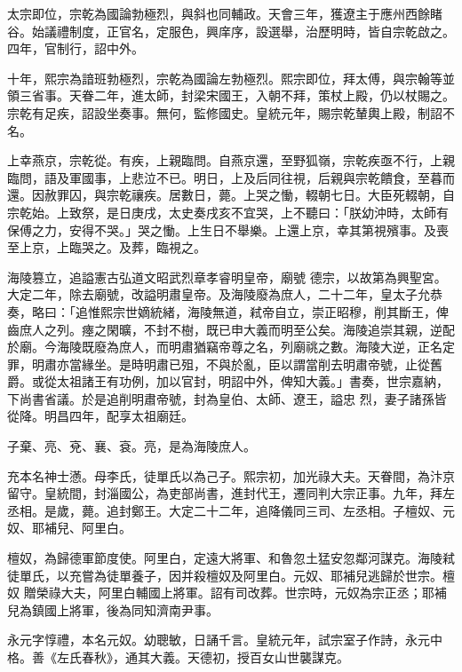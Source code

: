 \begin{pinyinscope}
 太宗即位，宗乾為國論勃極烈，與斜也同輔政。天會三年，獲遼主于應州西餘睹谷。始議禮制度，正官名，定服色，興庠序，設選舉，治歷明時，皆自宗乾啟之。四年，官制行，詔中外。



 十年，熙宗為諳班勃極烈，宗乾為國論左勃極烈。熙宗即位，拜太傅，與宗翰等並領三省事。天眷二年，進太師，封梁宋國王，入朝不拜，策杖上殿，仍以杖賜之。
 宗乾有足疾，詔設坐奏事。無何，監修國史。皇統元年，賜宗乾輦輿上殿，制詔不名。



 上幸燕京，宗乾從。有疾，上親臨問。自燕京還，至野狐嶺，宗乾疾亟不行，上親臨問，語及軍國事，上悲泣不已。明日，上及后同往視，后親與宗乾饋食，至暮而還。因赦罪囚，與宗乾禳疾。居數日，薨。上哭之慟，輟朝七日。大臣死輟朝，自宗乾始。上致祭，是日庚戌，太史奏戌亥不宜哭，上不聽曰：「朕幼沖時，太師有保傅之力，安得不哭。」哭之慟。上生日不舉樂。上還上京，幸其第視殯事。及喪至上京，上臨哭之。及葬，臨視之。



 海陵篡立，追謚憲古弘道文昭武烈章孝睿明皇帝，廟號
 德宗，以故第為興聖宮。大定二年，除去廟號，改謚明肅皇帝。及海陵廢為庶人，二十二年，皇太子允恭奏，略曰：「追惟熙宗世嫡統緒，海陵無道，弒帝自立，崇正昭穆，削其斷王，俾齒庶人之列。瘞之閑曠，不封不樹，既已申大義而明至公矣。海陵追崇其親，逆配於廟。今海陵既廢為庶人，而明肅猶竊帝尊之名，列廟祧之數。海陵大逆，正名定罪，明肅亦當緣坐。是時明肅已殂，不與於亂，臣以謂當削去明肅帝號，止從舊爵。或從太祖諸王有功例，加以官封，明詔中外，俾知大義。」書奏，世宗嘉納，下尚書省議。於是追削明肅帝號，封為皇伯、太師、遼王，謚忠
 烈，妻子諸孫皆從降。明昌四年，配享太祖廟廷。



 子棄、亮、兗、襄、袞。亮，是為海陵庶人。



 充本名神士懣。母李氏，徒單氏以為己子。熙宗初，加光祿大夫。天眷間，為汴京留守。皇統間，封淄國公，為吏部尚書，進封代王，遷同判大宗正事。九年，拜左丞相。是歲，薨。追封鄭王。大定二十二年，追降儀同三司、左丞相。子檀奴、元奴、耶補兒、阿里白。



 檀奴，為歸德軍節度使。阿里白，定遠大將軍、和魯忽土猛安忽鄰河謀克。海陵弒徒單氏，以充嘗為徒單養子，因并殺檀奴及阿里白。元奴、耶補兒逃歸於世宗。檀奴
 贈榮祿大夫，阿里白輔國上將軍。詔有司改葬。世宗時，元奴為宗正丞；耶補兒為鎮國上將軍，後為同知濟南尹事。



 永元字惇禮，本名元奴。幼聰敏，日誦千言。皇統元年，試宗室子作詩，永元中格。善《左氏春秋》，通其大義。天德初，授百女山世襲謀克。




\end{pinyinscope}
